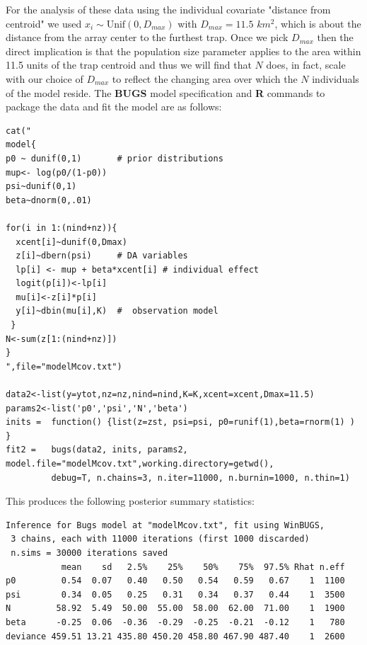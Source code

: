 For the analysis of these data using the individual covariate
"distance from centroid" we used $x_{i} \sim \mbox{Unif}(0,D_{max})$
with $D_{max} = 11.5$ $km^2$, which is about the distance from the
array center to the furthest trap.  Once we pick $D_{max}$ then the
direct implication is that the population size parameter applies to
the area within 11.5 units of the trap centroid and thus we will find
that $N$ does, in fact, scale with our choice of $D_{max}$ to reflect
the changing area over which the $N$ individuals of the model reside.
The {\bf BUGS} model specification and {\bf R} commands to package the
data and fit the model are as follows:
{\small
\begin{verbatim}
cat("
model{
p0 ~ dunif(0,1)       # prior distributions
mup<- log(p0/(1-p0))
psi~dunif(0,1)
beta~dnorm(0,.01)

for(i in 1:(nind+nz)){
  xcent[i]~dunif(0,Dmax)
  z[i]~dbern(psi)     # DA variables
  lp[i] <- mup + beta*xcent[i] # individual effect
  logit(p[i])<-lp[i]
  mu[i]<-z[i]*p[i]
  y[i]~dbin(mu[i],K)  #  observation model
 }
N<-sum(z[1:(nind+nz)])
}
",file="modelMcov.txt")

data2<-list(y=ytot,nz=nz,nind=nind,K=K,xcent=xcent,Dmax=11.5)
params2<-list('p0','psi','N','beta')
inits =  function() {list(z=zst, psi=psi, p0=runif(1),beta=rnorm(1) ) }
fit2 =   bugs(data2, inits, params2, model.file="modelMcov.txt",working.directory=getwd(),
         debug=T, n.chains=3, n.iter=11000, n.burnin=1000, n.thin=1)
\end{verbatim}
}
This produces the following posterior summary statistics:
{\small
\begin{verbatim}
Inference for Bugs model at "modelMcov.txt", fit using WinBUGS,
 3 chains, each with 11000 iterations (first 1000 discarded)
 n.sims = 30000 iterations saved
           mean    sd   2.5%    25%    50%    75%  97.5% Rhat n.eff
p0         0.54  0.07   0.40   0.50   0.54   0.59   0.67    1  1100
psi        0.34  0.05   0.25   0.31   0.34   0.37   0.44    1  3500
N         58.92  5.49  50.00  55.00  58.00  62.00  71.00    1  1900
beta      -0.25  0.06  -0.36  -0.29  -0.25  -0.21  -0.12    1   780
deviance 459.51 13.21 435.80 450.20 458.80 467.90 487.40    1  2600
\end{verbatim}
}

